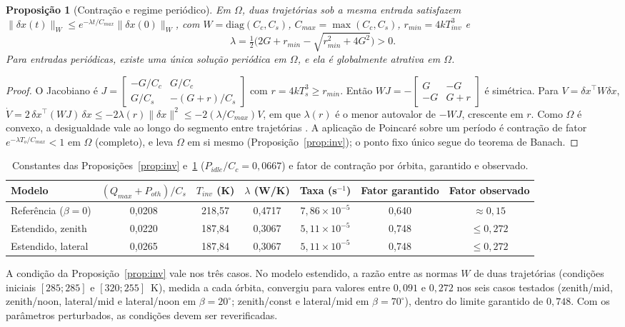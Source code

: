 \documentclass[12pt,a4paper]{article}
\newtheorem{prop}{Proposição}
\begin{document}
\begin{prop}[Contração e regime periódico]\label{prop:contr}
Em $\Omega$, duas trajetórias sob a mesma entrada satisfazem
$\|\delta x(t)\|_W\le e^{-\lambda t/C_{max}}\|\delta x(0)\|_W$, com
$W=\mathrm{diag}(C_c,C_s)$, $C_{max}=\max(C_c,C_s)$, $r_{min}=4kT_{inv}^3$ e
\[
\lambda=\tfrac12\Big(2G+r_{min}-\sqrt{r_{min}^2+4G^2}\Big)>0.
\]
Para entradas periódicas, existe uma única solução periódica em $\Omega$, e ela
é globalmente atrativa em $\Omega$.
\end{prop}
\begin{proof}
O Jacobiano é
$J=\begin{bmatrix}-G/C_c&G/C_c\\G/C_s&-(G+r)/C_s\end{bmatrix}$ com
$r=4kT_s^3\ge r_{min}$. Então
$WJ=-\begin{bmatrix}G&-G\\-G&G+r\end{bmatrix}$ é simétrica. Para
$V=\delta x^\top W\delta x$,
$\dot V=2\,\delta x^\top(WJ)\,\delta x\le-2\lambda(r)\|\delta x\|^2\le-2(\lambda/C_{max})V$,
em que $\lambda(r)$ é o menor autovalor de $-WJ$, crescente em $r$. Como
$\Omega$ é convexo, a desigualdade vale ao longo do segmento entre trajetórias
\cite{lohmiller1998}. A aplicação de Poincaré sobre um período é contração de
fator $e^{-\lambda T_o/C_{max}}<1$ em $\Omega$ (completo), e leva $\Omega$ em si
mesmo (Proposição~\ref{prop:inv}); o ponto fixo único segue do teorema de
Banach.
\end{proof}
\begin{table}[h]\centering\small
\caption{Constantes das Proposições~\ref{prop:inv} e~\ref{prop:contr}
($P_{idle}/C_c=0{,}0667$) e fator de contração por órbita, garantido e
observado.}
\label{tab:contr}
\begin{tabular}{@{}lcccccc@{}}\toprule
Modelo & $(Q_{max}{+}P_{oth})/C_s$ & $T_{inv}$ (K) & $\lambda$ (W/K) & Taxa (s$^{-1}$) & Fator garantido & Fator observado\\\midrule
Referência ($\beta=0$) & 0,0208 & 218,57 & 0,4717 & $7{,}86\times10^{-5}$ & 0,640 & $\approx0{,}15$\\
Estendido, zenith & 0,0220 & 187,84 & 0,3067 & $5{,}11\times10^{-5}$ & 0,748 & $\le0{,}272$\\
Estendido, lateral & 0,0265 & 187,84 & 0,3067 & $5{,}11\times10^{-5}$ & 0,748 & $\le0{,}272$\\
\bottomrule\end{tabular}\end{table}
A condição da Proposição~\ref{prop:inv} vale nos três casos. No modelo
estendido, a razão entre as normas $W$ de duas trajetórias (condições iniciais
$[285;285]$ e $[320;255]$~K), medida a cada órbita, convergiu para valores
entre $0{,}091$ e $0{,}272$ nos seis casos testados (zenith/mid, zenith/noon,
lateral/mid e lateral/noon em $\beta=20^\circ$; zenith/const e lateral/mid em
$\beta=70^\circ$), dentro do limite garantido de $0{,}748$. Com os parâmetros
perturbados, as condições devem ser reverificadas.
\end{document}
